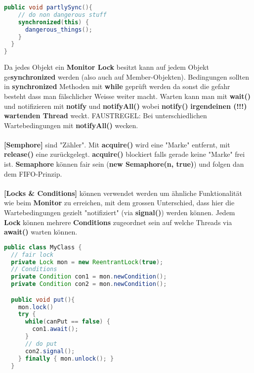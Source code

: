 \documentclass[8pt]{extarticle}
\let\oldtextbf\textbf
\renewcommand{\textbf}{\tiny\oldtextbf}
\begin{document}
\begin{multicols*}{5}
\begin{lstlisting}[language=java]
  public void partlySync(){
    // do non dangerous stuff
    synchronized(this) {
      dangerous_things();
    }
  }
}
\end{lstlisting}
Da jedes Objekt ein \textbf{Monitor Lock} besitzt kann auf jedem Objekt ge\textbf{synchronized} werden (also auch auf Member-Objekten). Bedingungen sollten in \textbf{synchronized} Methoden mit \textbf{while} geprüft werden da sonst die gefahr besteht dass man fälschlicher Weisse weiter macht. Warten kann man mit \textbf{wait()} und notifizieren mit \textbf{notify} und \textbf{notifyAll()} wobei \textbf{notify()} \textbf{irgendeinen (!!!) wartenden Thread} weckt. FAUSTREGEL: Bei unterschiedlichen Wartebedingungen mit \textbf{notifyAll()} wecken.\\\\
\textbf{[Semphore]} sind "Zähler". Mit \textbf{acquire()} wird eine "Marke" entfernt, mit \textbf{release()} eine zurückgelegt. \textbf{acquire()} blockiert falls gerade keine "Marke" frei ist. \textbf{Semaphore} können fair sein (\textbf{new Semaphore(n, true)}) und folgen dan dem FIFO-Prinzip.\\\\
\textbf{[Locks \& Conditions]} können verwendet werden um ähnliche Funktionalität wie beim \textbf{Monitor} zu erreichen, mit dem grossen Unterschied, dass hier die Wartebedingungen gezielt "notifiziert" (via \textbf{signal()}) werden können. Jedem \textbf{Lock} können mehrere \textbf{Conditions} zugeordnet sein auf welche Threads via \textbf{await()} warten können.
\begin{lstlisting}[language=java]
public class MyClass {
  // fair lock
  private Lock mon = new ReentrantLock(true);
  // Conditions
  private Condition con1 = mon.newCondition();
  private Condition con2 = mon.newCondition();

  public void put(){
    mon.lock()
    try {
      while(canPut == false) {
        con1.await();
      }
      // do put
      con2.signal();
    } finally { mon.unlock(); }
  }


\end{lstlisting}
\end{multicols*}
\end{document}
